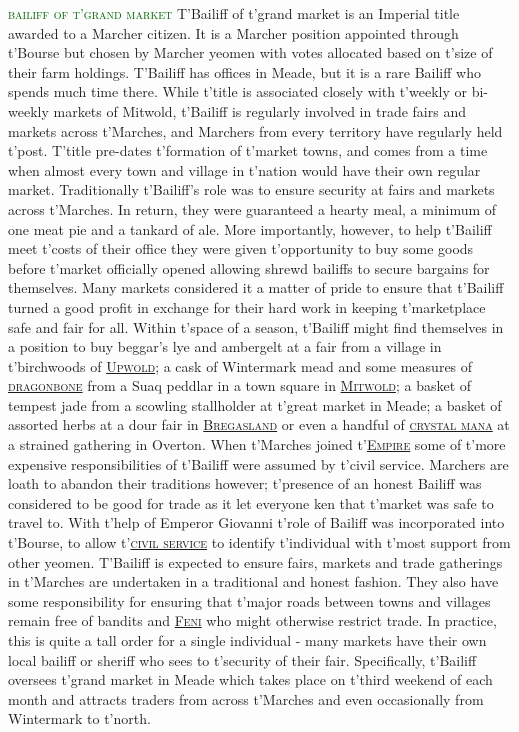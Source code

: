 \documentclass[twoside,11pt,b5paper,twocolumn]{scrbook}
\newcommand{\estcab}[1]{\textsc{\textcolor{marron}{#1}}}
\newcommand{\keyword}[1]{\textcolor{darkgreen}{#1}}
\renewcommand{\paragraph}[1]{\par\noindent\markboth{#1}{#1}\estcab{\keyword{#1}}\label{#1} }
\newcommand{\see}[1]{{\estcab{\hyperref[#1]{#1}}}}
\begin{document}
\paragraph{bailiff of t'grand market} T'Bailiff of t'grand market is an Imperial title awarded to a Marcher citizen. It is a Marcher position appointed through t'Bourse but chosen by Marcher yeomen with votes allocated based on t'size of their farm holdings. T'Bailiff has offices in Meade, but it is a rare Bailiff who spends much time there. While t'title is associated closely with t'weekly or bi-weekly markets of Mitwold, t'Bailiff is regularly involved in trade fairs and markets across t'Marches, and Marchers from every territory have regularly held t'post. T'title pre-dates t'formation of t'market towns, and comes from a time when almost every town and village in t'nation would have their own regular market. Traditionally t'Bailiff's role was to ensure security at fairs and markets across t'Marches. In return, they were guaranteed a hearty meal, a minimum of one meat pie and a tankard of ale. More importantly, however, to help t'Bailiff meet t'costs of their office they were given t'opportunity to buy some goods before t'market officially opened allowing shrewd bailiffs to secure bargains for themselves. Many markets considered it a matter of pride to ensure that t'Bailiff turned a good profit in exchange for their hard work in keeping t'marketplace safe and fair for all. Within t'space of a season, t'Bailiff might find themselves in a position to buy beggar's lye and ambergelt at a fair from a village in t'birchwoods of \see{Upwold}; a cask of Wintermark mead and some measures of \see{dragonbone} from a Suaq peddlar in a town square in \see{Mitwold}; a basket of tempest jade from a scowling stallholder at t'great market in Meade; a basket of assorted herbs at a dour fair in \see{Bregasland} or even a handful of \see{crystal mana} at a strained gathering in Overton. When t'Marches joined t'\see{Empire} some of t'more expensive responsibilities of t'Bailiff were assumed by t'civil service. Marchers are loath to abandon their traditions however; t'presence of an honest Bailiff was considered to be good for trade as it let everyone ken that t'market was safe to travel to. With t'help of Emperor Giovanni t'role of Bailiff was incorporated into t'Bourse, to allow t'\see{civil service} to identify t'individual with t'most support from other yeomen. T'Bailiff is expected to ensure fairs, markets and trade gatherings in t'Marches are undertaken in a traditional and honest fashion. They also have some responsibility for ensuring that t'major roads between towns and villages remain free of bandits and \see{Feni} who might otherwise restrict trade. In practice, this is quite a tall order for a single individual - many markets have their own local bailiff or sheriff who sees to t'security of their fair. Specifically, t'Bailiff oversees t'grand market in Meade which takes place on t'third weekend of each month and attracts traders from across t'Marches and even occasionally from Wintermark to t'north. 
\end{document}

